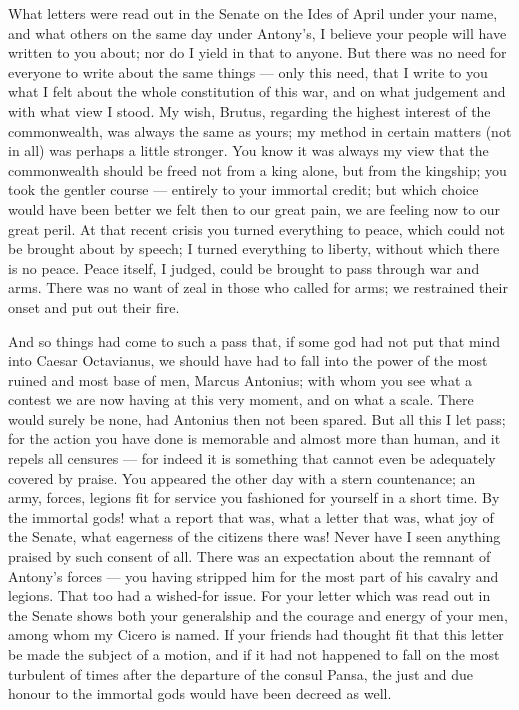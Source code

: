 

 What letters were read out in the Senate on the Ides of April under your name, and what others on the same day under Antony's, I believe your people will have written to you about; nor do I yield in that to anyone. But there was no need for everyone to write about the same things --- only this need, that I write to you what I felt about the whole constitution of this war, and on what judgement and with what view I stood. My wish, Brutus, regarding the highest interest of the commonwealth, was always the same as yours; my method in certain matters (not in all) was perhaps a little stronger. You know it was always my view that the commonwealth should be freed not from a king alone, but from the kingship; you took the gentler course --- entirely to your immortal credit; but which choice would have been better we felt then to our great pain, we are feeling now to our great peril. At that recent crisis you turned everything to peace, which could not be brought about by speech; I turned everything to liberty, without which there is no peace. Peace itself, I judged, could be brought to pass through war and arms. There was no want of zeal in those who called for arms; we restrained their onset and put out their fire.

 And so things had come to such a pass that, if some god had not put that mind into Caesar Octavianus, we should have had to fall into the power of the most ruined and most base of men, Marcus Antonius; with whom you see what a contest we are now having at this very moment, and on what a scale. There would surely be none, had Antonius then not been spared. But all this I let pass; for the action you have done is memorable and almost more than human, and it repels all censures --- for indeed it is something that cannot even be adequately covered by praise. You appeared the other day with a stern countenance; an army, forces, legions fit for service you fashioned for yourself in a short time. By the immortal gods! what a report that was, what a letter that was, what joy of the Senate, what eagerness of the citizens there was! Never have I seen anything praised by such consent of all. There was an expectation about the remnant of Antony's forces --- you having stripped him for the most part of his cavalry and legions. That too had a wished-for issue. For your letter which was read out in the Senate shows both your generalship and the courage and energy of your men, among whom my Cicero is named. If your friends had thought fit that this letter be made the subject of a motion, and if it had not happened to fall on the most turbulent of times after the departure of the consul Pansa, the just and due honour to the immortal gods would have been decreed as well.


